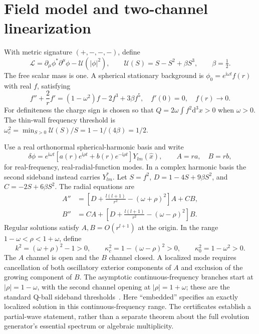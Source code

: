 \documentclass[a4paper,11pt]{article}
\newcommand{\dd}{\mathrm{d}}
\newcommand{\ii}{\mathrm{i}}
\begin{document}
\section{Field model and two-channel linearization}\label{sec:model}
With metric signature $(+,-,-,-)$, define
\begin{equation}\label{eq:action}
\mathcal L=\partial_\mu\phi^*\partial^\mu\phi-\mathcal U(|\phi|^2),
\qquad \mathcal U(S)=S-S^2+\beta S^3,\qquad \beta=\tfrac12.
\end{equation}
The free scalar mass is one. A spherical stationary background is
$\phi_0=e^{\ii\omega t}f(r)$ with real $f$, satisfying
\begin{equation}\label{eq:profile}
f''+\frac2r f'=(1-\omega^2)f-2f^3+3\beta f^5,
\quad f'(0)=0,\quad f(r)\longrightarrow0.
\end{equation}
For definiteness the charge sign is chosen so that
$Q=2\omega\int f^2\dd^3x>0$ when $\omega>0$.
The thin-wall frequency threshold is
$\omega_c^2=\min_{S>0}\mathcal U(S)/S=1-1/(4\beta)=1/2$.

Use a real orthonormal spherical-harmonic basis and write
\begin{equation}\label{eq:ansatz}
\delta\phi=e^{\ii\omega t}
 [a(r)e^{\ii\rho t}+b(r)e^{-\ii\rho t}]Y_{lm}(\hat x),
\qquad A=ra,\quad B=rb,
\end{equation}
for real-frequency, real-radial-function modes. In a complex harmonic basis
the second sideband instead carries $Y_{lm}^*$.
Let $S=f^2$, $D=1-4S+9\beta S^2$, and $C=-2S+6\beta S^2$.
The radial equations are
\begin{align}
 A''&=\left[D+\frac{l(l+1)}{r^2}-(\omega+\rho)^2\right]A+CB,
 \label{eq:radialA}\\
 B''&=CA+\left[D+\frac{l(l+1)}{r^2}-(\omega-\rho)^2\right]B.
 \label{eq:radialB}
\end{align}
Regular solutions satisfy $A,B=O(r^{l+1})$ at the origin.
In the range $1-\omega<\rho<1+\omega$, define
\begin{equation}\label{eq:channels}
k^2=(\omega+\rho)^2-1>0,\qquad
\kappa_c^2=1-(\omega-\rho)^2>0,\qquad
\kappa_0^2=1-\omega^2>0.
\end{equation}
The $A$ channel is open and the $B$ channel closed. A localized mode
requires cancellation of both oscillatory exterior components of $A$
and exclusion of the growing component of $B$.
The asymptotic continuous-frequency branches start at $|\rho|=1-\omega$,
with the second channel opening at $|\rho|=1+\omega$; these are the
standard Q-ball sideband thresholds~\cite{Kovtun2018,Ciurla2024}.
Here ``embedded'' specifies an exactly localized solution in this
continuous-frequency range. The certificates establish a partial-wave
statement, rather than a separate theorem about the full evolution
generator's essential spectrum or algebraic multiplicity.
\end{document}
